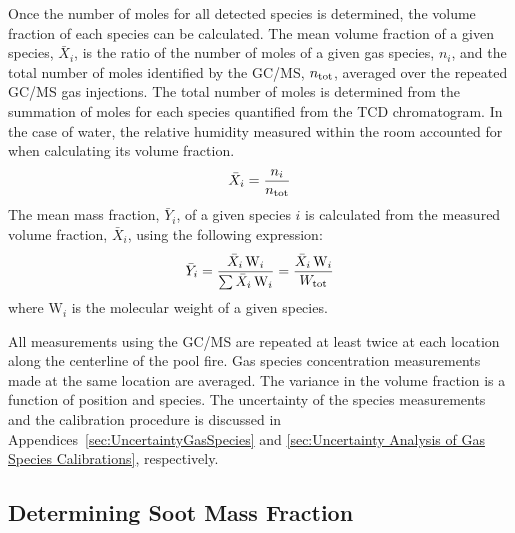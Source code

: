 \documentclass[12pt]{article}
\begin{document}
Once the number of moles for all detected species is determined, the volume fraction of each species can be calculated. The mean volume fraction of a given species, $\bar{X}_{i}$, is the ratio of the number of moles of a given gas species, $n_{i}$, and the total number of moles identified by the GC/MS, $n_{\rm tot}$, averaged over the repeated GC/MS gas injections. The total number of moles is determined from the summation of moles for each species quantified from the TCD chromatogram. In the case of water, the relative humidity measured within the room accounted for when calculating its volume fraction.
\begin{equation}\label{eq:volume_fraction}
  	\bar{X}_{i}= \frac{n_{i}}{n_{\rm tot}}
\end{equation}
The mean mass fraction, $\bar{Y}_{i}$, of a given species $i$ is calculated from the measured volume fraction, $\bar{X}_{i}$, using the following expression:
\begin{equation}\label{eq:mass_fraction}
	\bar{Y}_{i}=\frac{\bar{X}_{i} \, {\textrm{W}_{i}}}{\sum{\bar{X}_{i} \, {\textrm{W}_{i}}}}=\frac{\bar{X}_{i} \, {\textrm{W}_{i}}}{W_{\rm{tot}}}
\end{equation}
where ${{\textrm{W}_{i}}}$ is the molecular weight of a given species.

All measurements using the GC/MS are repeated at least twice at each location along the centerline of the pool fire. Gas species concentration measurements made at the same location are averaged. The variance in the volume fraction is a function of position and species. The uncertainty of the species measurements and the calibration procedure is discussed in Appendices~\ref{sec:UncertaintyGasSpecies} and \ref{sec:Uncertainty Analysis of Gas Species Calibrations}, respectively.

\subsection{Determining Soot Mass Fraction}
\label{ssec:Soot_Setup}
\end{document}
